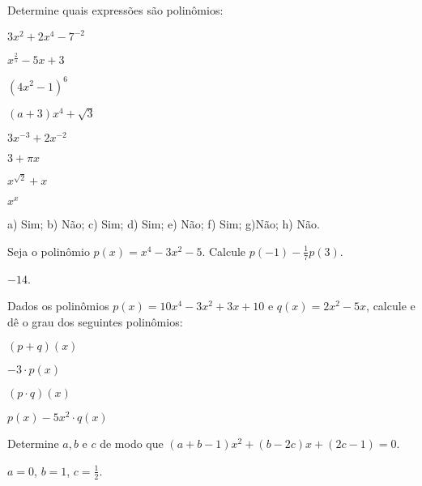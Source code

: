 \begin{secExercicios}

    \begin{exer}
    \item Determine quais expressões são polinômios:
    \begin{enumerate}[a)]
    \begin{multicols}{2}
         \item $3x^2+2x^4-7^{-2}$
         \item $x^{\frac{2}{5}}-5x+3$
         \item $(4x^2-1)^6$
         \item $(a+3)x^4+\sqrt{3}$
         \item $3x^{-3}+2x^{-2}$
         \item $3+\pi x$
         \item $x^{\sqrt{2}}+x$
         \item $x^x$
    \end{multicols}
    \end{enumerate}
    \end{exer}
    \begin{resp}
     a) Sim; b) Não; c) Sim; d) Sim; e) Não; f) Sim; g)Não; h) Não.
    \end{resp}

    \begin{exer}
        Seja o polinômio $p(x)=x^4-3x^2-5$. Calcule $p(-1)-\frac{1}{7}p(3)$.
    \end{exer}
    \begin{resp}
        $-14$.
    \end{resp}

        \begin{exer}
        Dados os polinômios $p(x)=10x^4-3x^2+3x+10$ e $q(x)=2x^2-5x$, calcule e dê o grau dos seguintes polinômios:
        \begin{enumerate}[a)]
        \begin{multicols}{2}
            \item $(p+q)(x)$
            \item $-3\cdot p(x)$
            \item $(p\cdot q)(x)$
            \item $p(x)-5x^2\cdot q(x)$
        \end{multicols}
        \end{enumerate}
    \end{exer}

    \begin{exer}
        Determine $a,b$ e $c$ de modo que $(a+b-1)x^2+(b-2c)x+(2c-1)=0$.
    \end{exer}
    \begin{resp}
        $a=0$, $b=1$, $c=\frac{1}{2}$.
    \end{resp}


\end{secExercicios}
